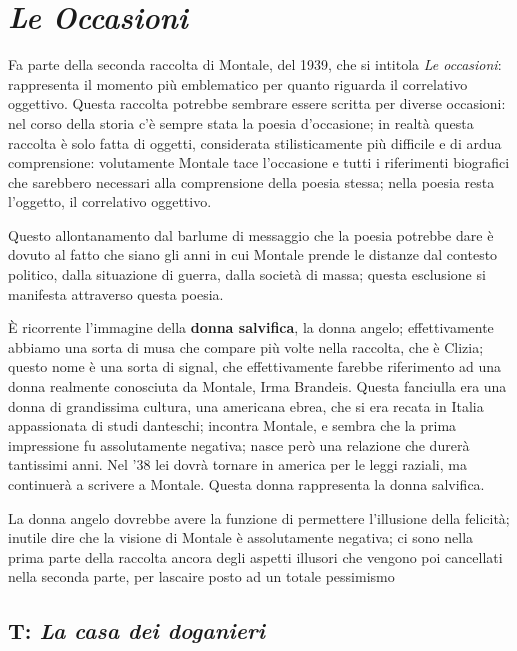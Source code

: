 \section{\textit{Le Occasioni}}

Fa parte della seconda raccolta di Montale, del 1939, che si intitola \textit{Le occasioni}: rappresenta il momento più emblematico per quanto riguarda il correlativo oggettivo. Questa raccolta potrebbe sembrare essere scritta per diverse occasioni: nel corso della storia c'è sempre stata la poesia d'occasione; in realtà questa raccolta è solo fatta di oggetti, considerata stilisticamente più difficile e di ardua comprensione: volutamente Montale tace l'occasione e tutti i riferimenti biografici che sarebbero necessari alla comprensione della poesia stessa; nella poesia resta l'oggetto, il correlativo oggettivo.

Questo allontanamento dal barlume di messaggio che la poesia potrebbe dare è dovuto al fatto che siano gli anni in cui Montale prende le distanze dal contesto politico, dalla situazione di guerra, dalla società di massa; questa esclusione si manifesta attraverso questa poesia.

È ricorrente l'immagine della \textbf{donna salvifica}, la donna angelo; effettivamente abbiamo una sorta di musa che compare più volte nella raccolta, che è Clizia; questo nome è una sorta di signal, che effettivamente farebbe riferimento ad una donna realmente conosciuta da Montale, Irma Brandeis. Questa fanciulla era una donna di grandissima cultura, una americana ebrea, che si era recata in Italia appassionata di studi danteschi; incontra Montale, e sembra che la prima impressione fu assolutamente negativa; nasce però una relazione che durerà tantissimi anni. Nel '38 lei dovrà tornare in america per le leggi raziali, ma continuerà a scrivere a Montale. Questa donna rappresenta la donna salvifica.

La donna angelo dovrebbe avere la funzione di permettere l'illusione della felicità; inutile dire che la visione di Montale è assolutamente negativa; ci sono nella prima parte della raccolta ancora degli aspetti illusori che vengono poi cancellati nella seconda parte, per lascaire posto ad un totale pessimismo

\subsection{T: \textit{La casa dei doganieri}}


